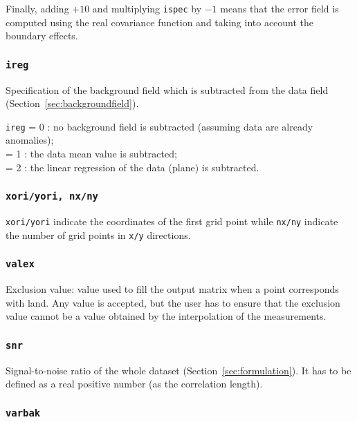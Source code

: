 Finally, adding $+10$ and multiplying \texttt{ispec} by $-1$ means that the error field is computed using the real covariance function and taking into account the boundary effects. 

\subsubsection{\texttt{ireg}}

Specification of the background field which is subtracted from the data field (Section~\ref{sec:backgroundfield}).

\texttt{ireg}             = 0 \qquad: no background field is subtracted (assuming data are already anomalies); \\
  = 1 \qquad: the data mean value is subtracted;\\
  = 2 \qquad: the linear regression of the data (plane) is subtracted.

\subsubsection{\texttt{xori/yori, nx/ny}}

\texttt{xori/yori} indicate the coordinates of the first grid point while \texttt{nx/ny} indicate the number of grid points in \texttt{x/y} directions.



\subsubsection{\texttt{valex}}

Exclusion value: value used to fill the output matrix when a point corresponds with land. Any value is accepted, but the user has to ensure that the exclusion value cannot be a value obtained by the interpolation of the measurements. 


\subsubsection{\texttt{snr}}

Signal-to-noise ratio of the whole dataset (Section~\ref{sec:formulation}). It has to be defined as a real positive number (as the correlation length).

\subsubsection{\texttt{varbak}}

